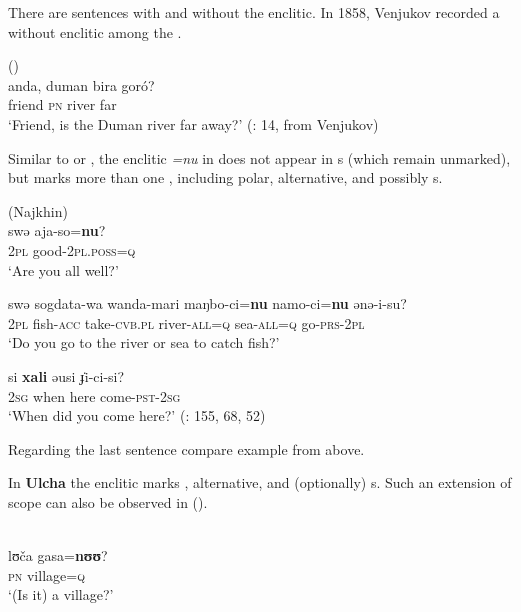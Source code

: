 There are sentences with and without the enclitic. In 1858, Venjukov recorded a  without enclitic among the  .

\ea%
    \label{ex:tungu:52}
     ()\\
    \gll anda, duman bira  goró?\\
    friend  \textsc{pn}    river  far\\
    \glt ‘Friend, is the Duman river far away?’ (\citealt{Alonso2011}: 14, from Venjukov)
    \z

Similar to  or , the enclitic \textit{=nu} in  does not appear in s (which remain unmarked), but marks more than one , including polar, alternative, and possibly s.

\ea%
    \label{ex:tungu:53}
     (Najkhin)\\
    \ea
    \gll swə aja-so=\textbf{{nu}}?\\
    2\textsc{pl}  good-2\textsc{pl}.\textsc{poss}=\textsc{q}\\
    \glt ‘Are you all well?’
    
    \ex
    \gll swə sogdata-wa  wanda-mari  maŋbo-ci=\textbf{{nu}} namo-ci=\textbf{{nu}} ənə-i-su?\\
    2\textsc{pl} fish-\textsc{acc} take-\textsc{cvb.pl}  river-\textsc{all}=\textsc{q}  sea-\textsc{all}=\textsc{q} go-\textsc{prs}-2\textsc{pl}\\
    \glt ‘Do you go to the river or sea to catch fish?’
    
    \ex
    \gll si \textbf{{xali}} əusi  \.{ɟ}i-ci-si?\\
    2\textsc{sg}  when  here  come-\textsc{pst}-2\textsc{sg}\\
    \glt ‘When did you come here?’ (\citealt{KoYurn2011}: 155, 68, 52)\z\z

\noindent Regarding the last sentence compare example  from  above.

In \textbf{Ulcha} the enclitic marks , alternative, and (optionally) s. Such an extension of scope can also be observed in  ().

\ea%
    \label{ex:tungu:54}
    \\
    \ea
    \gll lʊča  gasa=\textbf{{nʊʊ}}?\\
    \textsc{pn}  village=\textsc{q}\\
    \glt ‘(Is it) a  village?’
    
